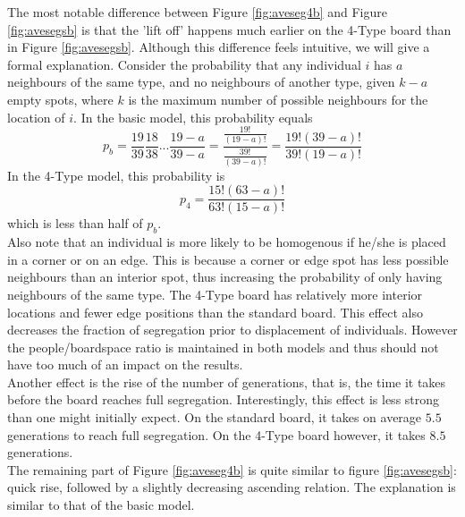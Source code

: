 The most notable difference between Figure \ref{fig:aveseg4b} and Figure \ref{fig:avesegsb} is that the 'lift off' happens much earlier on the 4-Type board than in Figure \ref{fig:avesegsb}. 
Although this difference feels intuitive, we will give a formal explanation. 
Consider the probability that any individual $i$ has $a$ neighbours of the same type, and no neighbours of another type, given $k-a$ empty spots, where $k$ is the maximum number of possible neighbours for the location of $i$. 
In the basic model, this probability equals
\[
p_b = \frac{19}{39}\frac{18}{38}...\frac{19-a}{39-a} = \frac{\frac{19!}{(19-a)!}}{\frac{39!}{(39-a)!}} = \frac{19!(39-a)!}{39!(19-a)!}
\]
In the 4-Type model, this probability is
\[
p_4 = \frac{15!(63-a)!}{63!(15-a)!}
\]
which is less than half of $p_b$.\\

Also note that an individual is more likely to be homogenous if he/she is placed in a corner or on an edge. 
This is because a corner or edge spot has less possible neighbours than an interior spot, thus increasing the probability of only having neighbours of the same type. 
The 4-Type board has relatively more interior locations and fewer edge positions than the standard board. This effect also decreases the fraction of segregation prior to displacement of individuals.
However the people/boardspace ratio is maintained in both models and thus should not have too much of an impact on the results.\\

Another effect is the rise of the number of generations, that is, the time it takes before the board reaches full segregation. 
Interestingly, this effect is less strong than one might initially expect. 
On the standard board, it takes on average $5.5$ generations to reach full segregation. On the 4-Type board however, it takes $8.5$ generations.\\

The remaining part of Figure \ref{fig:aveseg4b} is quite similar to figure \ref{fig:avesegsb}: quick rise, followed by a slightly decreasing ascending relation. 
The explanation is similar to that of the basic model.
